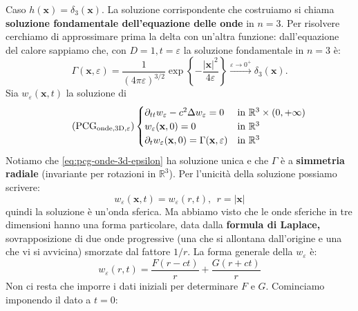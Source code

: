 \documentclass[10pt,a4paper,twoside,openright]{book}
\newcommand{\x}{\mathbf{x}}
\begin{document}
Caso $\displaystyle h(\x) =\delta _{3}(\x)$. La soluzione corrispondente che costruiamo si chiama \textbf{soluzione fondamentale dell'equazione delle onde} in $\displaystyle n=3$. Per risolvere cerchiamo di approssimare prima la delta con un'altra funzione: dall'equazione del calore sappiamo che, con $\displaystyle D=1,t=\varepsilon $ la soluzione fondamentale in $\displaystyle n=3$ è:
\begin{equation*}
	\Gamma (\x ,\varepsilon ) =\frac{1}{( 4\pi \varepsilon )^{3/2}}\exp\left\{-\frac{| \x| ^{2}}{4\varepsilon }\right\}\xrightarrow{\varepsilon \rightarrow 0^{+}} \delta _{3}(\x) .
\end{equation*}
Sia $\displaystyle w_{\varepsilon }(\x ,t)$ la soluzione di
\begin{equation*}
	\tag{PCG$_{\text{onde,3D},\varepsilon}$}
	\begin{cases}
		\partial _{tt} w_{\varepsilon } -c^{2} \Delta w_{\varepsilon } =0                & \text{in} \ \mathbb{R}^{3} \times ( 0,+\infty ) \\
		w_{\varepsilon }(\x ,0) =0                                               & \text{in} \ \mathbb{R}^{3}                      \\
		\partial _{t} w_{\varepsilon }(\x ,0) =\Gamma (\x ,\varepsilon ) & \text{in} \ \mathbb{R}^{3}                      
	\end{cases}
	\label{eq:pcg-onde-3d-epsilon}
\end{equation*}
Notiamo che \eqref{eq:pcg-onde-3d-epsilon} ha soluzione unica e che $\displaystyle \Gamma $ è a \textbf{simmetria radiale} (invariante per rotazioni in $\displaystyle \mathbb{R}^{3}$). Per l'unicità della soluzione possiamo scrivere:
\begin{equation*}
	w_{\varepsilon }(\x ,t) =w_{\varepsilon }( r,t) ,\ \ r=| \x| 
\end{equation*}
quindi la soluzione è un'onda sferica. Ma abbiamo visto che le onde sferiche in tre dimensioni hanno una forma particolare, data dalla \textbf{formula di Laplace, }sovrapposizione di due onde progressive (una che si allontana dall'origine e una che vi si avvicina) smorzate dal fattore $\displaystyle 1/r$. La forma generale della $\displaystyle w_{\varepsilon }$ è:
\begin{equation*}
	w_{\varepsilon }( r,t) =\frac{F( r-ct)}{r} +\frac{G( r+ct)}{r}
\end{equation*}
Non ci resta che imporre i dati iniziali per determinare $\displaystyle F$ e $\displaystyle G$. Cominciamo imponendo il dato a $\displaystyle t=0$:
\end{document}
